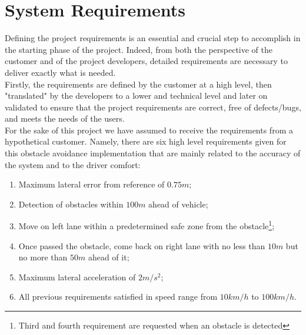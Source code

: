 \section{System Requirements} \label{System_Requirements}


Defining the project requirements is an essential and crucial step to accomplish in the starting phase of the project. Indeed, from both the perspective of the customer and of the project developers, detailed requirements are necessary to deliver exactly what is needed.\\
Firstly, the requirements are defined by the customer at a high level, then "translated" by the developers to a lower and technical level and later on validated to ensure that the project requirements are correct, free of defects/bugs, and meets the needs of the users.\\
For the sake of this project we have assumed to receive the requirements from a hypothetical customer.
Namely, there are six high level requirements given for this obstacle avoidance implementation that are mainly related to the accuracy of the system and to the driver comfort:
\begin{enumerate}
    \item Maximum lateral error from reference of $0.75 m$;
    \item Detection of obstacles within $100 m$ ahead of vehicle;
    \item Move on left lane within a predetermined safe zone from the obstacle\footnote{Third and fourth requirement are requested when an obstacle is detected};
    \item Once passed the obstacle, come back on right lane with no less than $10 m$ but no more than $50 m$ ahead of it;
    \item Maximum lateral acceleration of $2 m/s^2$;
    \item All previous requirements satisfied in speed range from $10 km/h$ to $100 km/h$.
\end{enumerate}
